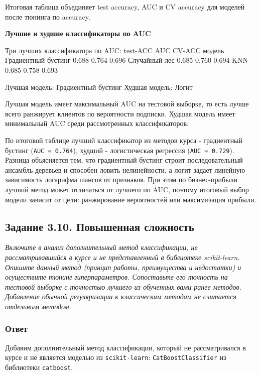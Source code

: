 \documentclass[11pt]{article}
\newenvironment{tasktext}
      {\begin{tcolorbox}[breakable, colback=black!3, colframe=black!28,
        boxrule=0.4pt, arc=1.5mm, left=7pt, right=7pt, top=5pt, bottom=5pt,
        before skip=0.35em, after skip=0.75em]\itshape}
      {\end{tcolorbox}}
\begin{document}
    Итоговая таблица объединяет test accuracy, AUC и CV accuracy для моделей
после тюнинга по accuracy.

    \textbf{Лучшие и худшие классификаторы по AUC}

Три лучших классификатора по AUC: test-ACC AUC CV-ACC модель\\
Градиентный бустинг 0.688 0.764 0.696 Случайный лес 0.685 0.760 0.694
KNN 0.685 0.758 0.693

Лучшая модель: Градиентный бустинг Худшая модель: Логит

    Лучшая модель имеет максимальный AUC на тестовой выборке, то есть лучше
всего ранжирует клиентов по вероятности подписки. Худшая модель имеет
минимальный AUC среди рассмотренных классификаторов.

По итоговой таблице лучший классификатор из методов курса - градиентный
бустинг (\texttt{AUC\ =\ 0.764}), худший - логистическая регрессия
(\texttt{AUC\ =\ 0.729}). Разница объясняется тем, что градиентный
бустинг строит последовательный ансамбль деревьев и способен ловить
нелинейности, а логит задает линейную зависимость логарифма шансов от
признаков. При этом по бизнес-прибыли лучший метод может отличаться от
лучшего по AUC, поэтому итоговый выбор модели зависит от цели:
ранжирование вероятностей или максимизация прибыли.

    \subsection{Задание 3.10. Повышенная
сложность}\label{ux437ux430ux434ux430ux43dux438ux435-3.10.-ux43fux43eux432ux44bux448ux435ux43dux43dux430ux44f-ux441ux43bux43eux436ux43dux43eux441ux442ux44c}

\begin{tasktext}
Включите в анализ дополнительный метод классификации, не
рассматривавшийся в курсе и не представленный в библиотеке scikit-learn.
Опишите данный метод (принцип работы, преимущества и недостатки) и
осуществите тюнинг гиперпараметров. Сопоставьте его точность на тестовой
выборке с точностью лучшего из обученных вами ранее методов. Добавление
обычной регуляризации к классическим методам не считается отдельным
методом.
\end{tasktext}

\subsubsection{Ответ}

Добавим дополнительный метод классификации, который не рассматривался в
курсе и не является моделью из \texttt{scikit-learn}:
\texttt{CatBoostClassifier} из библиотеки \texttt{catboost}.
\end{document}
